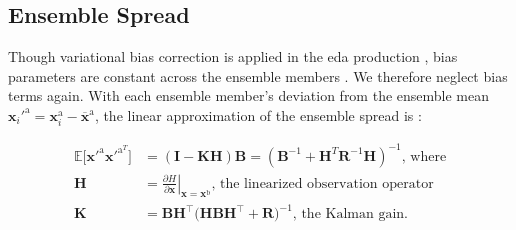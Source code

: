 \subsection{Ensemble Spread}\label{sec:EDA_spread}

Though variational bias correction is applied in the \gls{eda} production \parencite{deeBiasDataAssimilation2005}, bias parameters are constant across the ensemble members \parencite{hersbachERA5GlobalReanalysis2020}. We therefore neglect bias terms  again. With each ensemble member's deviation from the ensemble mean $\mathbf{x}_i'^{\mathrm{a}} =\mathbf{x}_i^{\mathrm{a}}-\overline{\mathbf{x}}^{\mathrm{a}}$, the linear approximation of the ensemble spread is \parencite{deeDataAssimilationPresence1998, higham14MatrixInversion2002}:

\begin{align} \label{eq:AnVar}
    \mathbb{E}\big[\mathbf{x}'^{\mathrm{a}}\mathbf{x}'^{\mathrm{a}^T}\big] & = (\mathbf{I}-\mathbf{K}\mathbf{H})\mathbf{B}=(\mathbf{B}^{-1}+\mathbf{H}^T\mathbf{R}^{-1}\mathbf{H})^{-1},\, \text{where}                    \\
    \mathbf{H}                                                             & = \left.  \frac{\partial H}{\partial \mathbf{x}}\right|_{\mathbf{x} = \mathbf{x}^{\mathrm{b}}}, \, \text{the linearized observation operator} \\
    \mathbf{K}                                                             & =\mathbf{B}\mathbf{H}^\top\big(\mathbf{H}\mathbf{B}\mathbf{H}^\top+\mathbf{R}\big)^{-1}, \, \text{the Kalman gain.}
\end{align}

